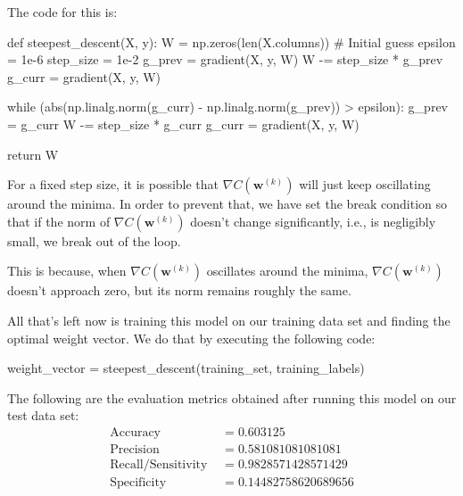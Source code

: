 \documentclass[journal,12pt,onecolumn]{IEEEtran}
\let\vec\mathbf
\begin{document}
	\vspace*{20pt}
	The code for this is:
	\begin{python}
	def steepest_descent(X, y):
    		W = np.zeros(len(X.columns)) # Initial guess
    		epsilon = 1e-6 
    		step_size = 1e-2 
    		g_prev = gradient(X, y, W)
    		W -= step_size * g_prev
    		g_curr = gradient(X, y, W)

    		while (abs(np.linalg.norm(g_curr) - np.linalg.norm(g_prev)) > epsilon): 
        		g_prev = g_curr
        		W -= step_size * g_curr
        		g_curr = gradient(X, y, W)

    		return W \end{python}
    		
    		For a fixed step size, it is possible that $\nabla C(\vec{w}^{(k)})$ will just keep oscillating around the minima. In order to prevent that, we have set the break condition so that if the norm of $\nabla C(\vec{w}^{(k)})$ doesn't change significantly, i.e., is negligibly small, we break out of the loop. 
    		
    		This is because, when $\nabla C(\vec{w}^{(k)})$ oscillates around the minima, $\nabla C(\vec{w}^{(k)})$ doesn't approach zero, but its norm remains roughly the same.
    		
    		\vspace*{30pt}
    		All that's left now is training this model on our training data set and finding the optimal weight vector. We do that by executing the following code:
    		\begin{python}
    		weight_vector = steepest_descent(training_set, training_labels) \end{python}
    		
    		The following are the evaluation metrics obtained after running this model on our test data set:
    		\begin{align}
    			\text{Accuracy } &= 0.603125 \\
    			\text{Precision } &= 0.581081081081081 \\
    			\text{Recall/Sensitivity } &= 0.9828571428571429 \\
    			\text{Specificity } &= 0.14482758620689656 
    		\end{align}
	
\end{document}
